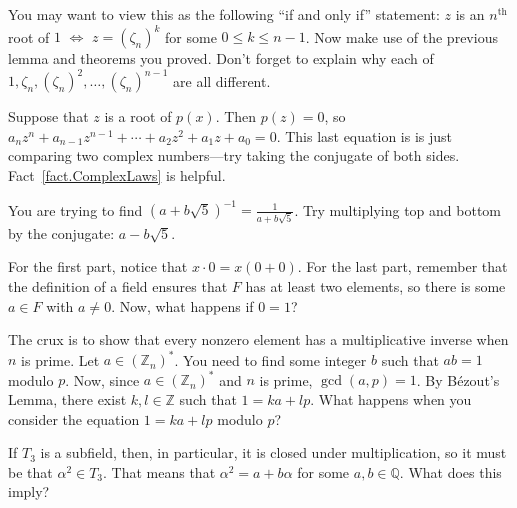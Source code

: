 \begin{hint*}
You may want to view this as the following ``if and only if'' statement: $z$ is an $n^\text{th}$ root of $1$ $\iff$ $z = (\zeta_n)^k$ for some $0\le k\le n-1$. Now make use of the previous lemma and theorems you proved. Don't forget to explain why each of $1, \zeta_n, (\zeta_n)^2, \ldots, (\zeta_n)^{n-1}$ are all different.
\end{hint*}

\begin{hint*}
Suppose that $z$ is a root of $p(x)$. Then $p(z) = 0$, so  $a_nz^n + a_{n-1}z^{n-1} +\cdots+a_2z^2+a_1z+a_0 = 0$. This last equation is is just comparing two complex numbers---try taking the conjugate of both sides. Fact~\ref{fact.ComplexLaws} is helpful.
\end{hint*}

\begin{hint*}
You are trying to find $(a+b\sqrt{5})^{-1} = \frac{1}{a+b\sqrt{5}}$. Try multiplying top and bottom by the conjugate: $a-b\sqrt{5}$.
\end{hint*}

\begin{hint*}
For the first part, notice that $x\cdot0 = x(0+0)$. For the last part, remember that the definition of a field ensures that $F$ has at least two elements, so there is some $a\in F$ with $a\neq 0$. Now, what happens if $0=1$?
\end{hint*}

\begin{hint*}
The crux is to show that every nonzero element has a multiplicative inverse when $n$ is prime. Let $a\in (\mathbb{Z}_n)^*$. You need to find some integer $b$ such that $ab=1$ modulo $p$. Now, since $a\in (\mathbb{Z}_n)^*$ and  $n$ is prime, $\gcd(a,p) = 1$. By B\'ezout's Lemma, there exist $k,l\in \mathbb{Z}$ such that $1 = ka+lp$. What happens when you consider the equation $1 = ka+lp$ modulo $p$?
\end{hint*}

\begin{hint*}
If $T_3$ is a subfield, then, in particular, it is closed under multiplication, so it must be that $\alpha^2\in T_3$. That means that $\alpha^2 = a+b\alpha$ for some $a,b\in \mathbb{Q}$. What does this imply?
\end{hint*}

